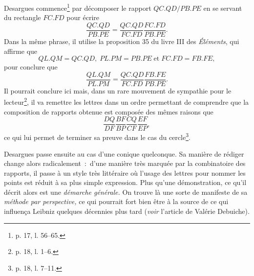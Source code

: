 \documentclass[12pt, a4paper]{article}
\begin{document}
Desargues commence\footnote{p. 17, l. 56--65.} par décomposer le rapport $QC.QD/PB.PE$ en se servant du rectangle $FC.FD$ pour écrire
\[
\frac{QC.QD}{PB.PE}=\frac{QC.QD}{FC.FD}\frac{FC.FD}{PB.PE}.
\]
Dans la même phrase, il utilise la proposition 35 du livre III des \textit{Éléments}, qui affirme que
\[
QL.QM=QC.QD,\; PL.PM=PB.PE\;\mbox{et}\;FC.FD=FB.FE,
\]
pour conclure que
\[
\frac{QL.QM}{PL.PM}=\frac{QC.QD}{FC.FD}\frac{FB.FE}{PB.PE}.
\]
Il pourrait conclure ici mais, dans un rare mouvement de sympathie pour le lecteur\footnote{p. 18, l. 1--6.}, il va  remettre les lettres dans un ordre permettant de comprendre que la composition de rapports obtenue est composée des mêmes raisons que
\[
\frac{DQ}{DF}\frac{BF}{BP}\frac{CQ}{CF}\frac{EF}{EP},
\]
ce qui lui permet de terminer sa preuve dans le cas du cercle\footnote{p. 18, l. 7--11.}.

Desargues passe ensuite au cas d'une conique quelconque. Sa manière de rédiger change alors radicalement~:~d'une manière très marquée par la combinatoire des rapports, il passe à un style très littéraire où l'usage des lettres pour nommer les points est réduit à sa plus simple expression. Plus qu'une démonstration, ce qu'il décrit alors est une \textit{démarche générale.} On trouve là une sorte de manifeste de sa \textit{méthode par perspective,} ce qui pourrait fort bien être à la source de ce qui influença Leibniz quelques décennies plus tard ({\it voir} l'article \cite{debuiche} de Valérie Debuiche).
\end{document}
